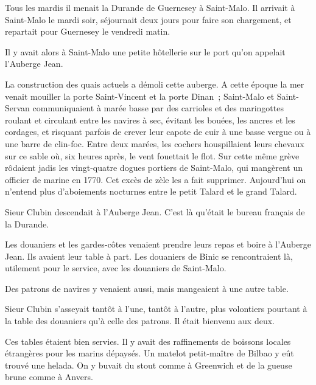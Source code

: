 \documentclass[french,twoside]{book} %
\begin{document}
Tous les mardis il menait la Durande de Guernesey à Saint-Malo. Il arrivait à Saint-Malo le mardi soir, séjournait deux jours pour faire son chargement, et repartait pour Guernesey le vendredi matin.\par
 Il y avait alors à Saint-Malo une petite hôtellerie sur le port qu’on appelait l’Auberge Jean.\par
La construction des quais actuels a démoli cette auberge. A cette époque la mer venait mouiller la porte Saint-Vincent et la porte Dinan ; Saint-Malo et Saint-Servan communiquaient à marée basse par des carrioles et des maringottes roulant et circulant entre les navires à sec, évitant les bouées, les ancres et les cordages, et risquant parfois de crever leur capote de cuir à une basse vergue ou à une barre de clin-foc. Entre deux marées, les cochers houspillaient leurs chevaux sur ce sable où, six heures après, le vent fouettait le flot. Sur cette même grève rôdaient jadis les vingt-quatre dogues portiers de Saint-Malo, qui mangèrent un officier de marine en 1770. Cet excès de zèle les a fait supprimer. Aujourd’hui on n’entend plus d’aboiements nocturnes entre le petit Talard et le grand Talard.\par
Sieur Clubin descendait à l’Auberge Jean. C’est là qu’était le bureau français de la Durande.\par
Les douaniers et les gardes-côtes venaient prendre leurs repas et boire à l’Auberge Jean. Ils avaient leur table à part. Les douaniers de Binic se rencontraient là, utilement pour le service, avec les douaniers de Saint-Malo.\par
Des patrons de navires y venaient aussi, mais mangeaient à une autre table.\par
Sieur Clubin s’asseyait tantôt à l’une, tantôt à l’autre, plus volontiers pourtant à la table des douaniers qu’à celle des patrons. Il était bienvenu aux deux.\par
 Ces tables étaient bien servies. Il y avait des raffinements de boissons locales étrangères pour les marins dépaysés. Un matelot petit-maître de Bilbao y eût trouvé une helada. On y buvait du stout comme à Greenwich et de la gueuse brune comme à Anvers.\par
\end{document}
